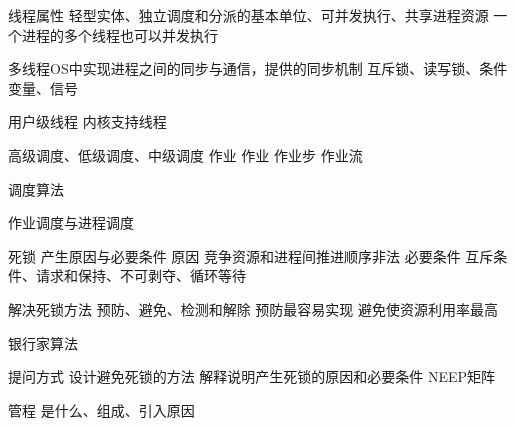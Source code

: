 线程属性
轻型实体、独立调度和分派的基本单位、可并发执行、共享进程资源
一个进程的多个线程也可以并发执行



多线程OS中实现进程之间的同步与通信，提供的同步机制
互斥锁、读写锁、条件变量、信号

用户级线程
内核支持线程

高级调度、低级调度、中级调度
作业
作业 作业步 作业流

调度算法

作业调度与进程调度

死锁
产生原因与必要条件
原因 竞争资源和进程间推进顺序非法
必要条件 互斥条件、请求和保持、不可剥夺、循环等待

解决死锁方法
预防、避免、检测和解除
预防最容易实现
避免使资源利用率最高

银行家算法


提问方式
设计避免死锁的方法
解释说明产生死锁的原因和必要条件
NEEP矩阵

管程 是什么、组成、引入原因




